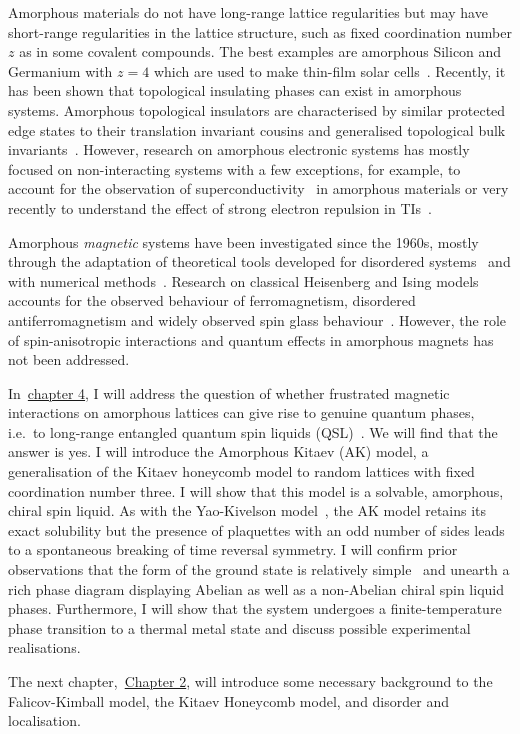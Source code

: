 Amorphous materials do not have long-range lattice regularities but may have short-range regularities in the lattice structure, such as fixed coordination number \(z\) as in some covalent compounds. The best examples are amorphous Silicon and Germanium with \(z=4\) which are used to make thin-film solar cells~\autocite{Weaire1971,betteridge1973possible}. Recently, it has been shown that topological insulating phases can exist in amorphous systems. Amorphous topological insulators are characterised by similar protected edge states to their translation invariant cousins and generalised topological bulk invariants~\autocite{mitchellAmorphousTopologicalInsulators2018,agarwala2019topological,marsalTopologicalWeaireThorpeModels2020,costa2019toward,agarwala2020higher,spring2021amorphous,corbae2019evidence}. However, research on amorphous electronic systems has mostly focused on non-interacting systems with a few exceptions, for example, to account for the observation of superconductivity~\autocite{buckel1954einfluss,mcmillan1981electron,meisel1981eliashberg,bergmann1976amorphous,mannaNoncrystallineTopologicalSuperconductors2022} in amorphous materials or very recently to understand the effect of strong electron repulsion in TIs~\autocite{kim2022fractionalization}.

Amorphous \emph{magnetic} systems have been investigated since the 1960s, mostly through the adaptation of theoretical tools developed for disordered systems~\autocite{aharony1975critical,Petrakovski1981,kaneyoshi1992introduction,Kaneyoshi2018} and with numerical methods~\autocite{fahnle1984monte,plascak2000ising}. Research on classical Heisenberg and Ising models accounts for the observed behaviour of ferromagnetism, disordered antiferromagnetism and widely observed spin glass behaviour~\autocite{coey1978amorphous}. However, the role of spin-anisotropic interactions and quantum effects in amorphous magnets has not been addressed.

In~\protect\hyperlink{chap:4-the-amorphous-kitaev-model}{chapter 4}, I will address the question of whether frustrated magnetic interactions on amorphous lattices can give rise to genuine quantum phases, i.e.~to long-range entangled quantum spin liquids (QSL)~\autocite{Anderson1973,Knolle2019,Savary2016,Lacroix2011}. We will find that the answer is yes. I will introduce the Amorphous Kitaev (AK) model, a generalisation of the Kitaev honeycomb model to random lattices with fixed coordination number three. I will show that this model is a solvable, amorphous, chiral spin liquid. As with the Yao-Kivelson model~\autocite{yaoExactChiralSpin2007}, the AK model retains its exact solubility but the presence of plaquettes with an odd number of sides leads to a spontaneous breaking of time reversal symmetry. I will confirm prior observations that the form of the ground state is relatively simple~\autocite{OBrienPRB2016,eschmannThermodynamicClassificationThreedimensional2020} and unearth a rich phase diagram displaying Abelian as well as a non-Abelian chiral spin liquid phases. Furthermore, I will show that the system undergoes a finite-temperature phase transition to a thermal metal state and discuss possible experimental realisations.

The next chapter,~\protect\hyperlink{chap:2-background}{Chapter 2}, will introduce some necessary background to the Falicov-Kimball model, the Kitaev Honeycomb model, and disorder and localisation.
